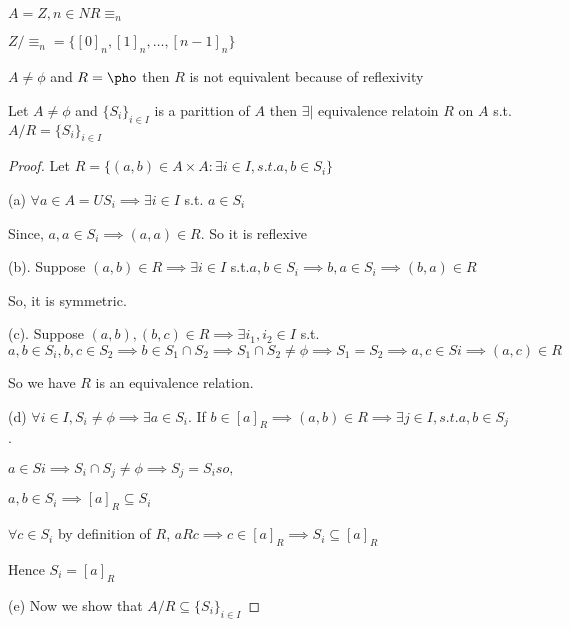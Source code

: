 \begin{eg}
    $A = Z, n \in N R \equiv_n $

    $Z/\equiv_n = \{[0]_n, [1]_n, \dots, [n-1]_n\}$
\end{eg}

\begin{eg}
    $A \ne \phi$ and  $R = \pho$ then  $R$ is not equivalent because of reflexivity

\end{eg}

\begin{theorem}
    Let $A \ne \phi$ and $\{S_i\}_{i \in I}$ is a parittion of  $A$ then $\exists |$ equivalence relatoin $R$ on $A$ s.t. $A / R = \{S_i\}_{i \in I}$
\end{theorem}
\begin{proof}

    Let $R = \{(a,b) \in A \times  A : \exists i \in I, s.t. a,b \in S_i\}$

    (a) $\forall a \in A = U S_i \implies \exists i \in I$ s.t.  $a \in S_i$

    Since,  $a,a \in S_i \implies (a,a) \in R$. So it is reflexive

    (b). Suppose $(a,b) \in R \implies \exists i \in I$ s.t.$a,b \in S_i \implies b,a \in S_i \implies (b,a) \in R$

    So, it is symmetric.

    (c). Suppose $(a,b),(b,c) \in R \implies \exists i_1,i_2 \in I$ s.t. $a,b \in S_i, b,c \in S_2 \implies b \in S_1 \cap S_2 \implies S_1 \cap S_2 \ne \phi \implies S_1 = S_2 \implies a ,c \in Si \implies (a,c) \in R$

    So we have $R$ is an equivalence relation.

    (d) $\forall i \in I, S_i \ne \phi \implies \exists a \in S_i$. If  $b \in [a]_R \implies (a,b) \in R \implies \exists j \in I, s.t. a,b \in S_j$. 

    $a \in Si \implies S_i \cap S_j \ne \phi \implies S_j = S_i so, $

    $a,b \in S_i \implies [a]_R \subseteq S_i$

    $\forall c \in S_i$ by definition of $R$, $aRc \implies c \in [a]_R \implies S_i \subseteq [a]_R$ 

    Hence  $S_i = [a]_R$


    (e) Now we show that  $A / R \subseteq \{S_i\}_{i \in I}$
    
\end{proof}
